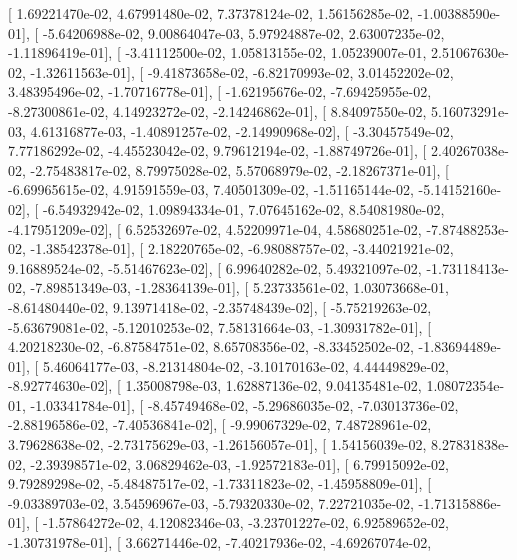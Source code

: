 \documentclass{article}
\begin{document}
       [  1.69221470e-02,   4.67991480e-02,   7.37378124e-02,
          1.56156285e-02,  -1.00388590e-01],
       [ -5.64206988e-02,   9.00864047e-03,   5.97924887e-02,
          2.63007235e-02,  -1.11896419e-01],
       [ -3.41112500e-02,   1.05813155e-02,   1.05239007e-01,
          2.51067630e-02,  -1.32611563e-01],
       [ -9.41873658e-02,  -6.82170993e-02,   3.01452202e-02,
          3.48395496e-02,  -1.70716778e-01],
       [ -1.62195676e-02,  -7.69425955e-02,  -8.27300861e-02,
          4.14923272e-02,  -2.14246862e-01],
       [  8.84097550e-02,   5.16073291e-03,   4.61316877e-03,
         -1.40891257e-02,  -2.14990968e-02],
       [ -3.30457549e-02,   7.77186292e-02,  -4.45523042e-02,
          9.79612194e-02,  -1.88749726e-01],
       [  2.40267038e-02,  -2.75483817e-02,   8.79975028e-02,
          5.57068979e-02,  -2.18267371e-01],
       [ -6.69965615e-02,   4.91591559e-03,   7.40501309e-02,
         -1.51165144e-02,  -5.14152160e-02],
       [ -6.54932942e-02,   1.09894334e-01,   7.07645162e-02,
          8.54081980e-02,  -4.17951209e-02],
       [  6.52532697e-02,   4.52209971e-04,   4.58680251e-02,
         -7.87488253e-02,  -1.38542378e-01],
       [  2.18220765e-02,  -6.98088757e-02,  -3.44021921e-02,
          9.16889524e-02,  -5.51467623e-02],
       [  6.99640282e-02,   5.49321097e-02,  -1.73118413e-02,
         -7.89851349e-03,  -1.28364139e-01],
       [  5.23733561e-02,   1.03073668e-01,  -8.61480440e-02,
          9.13971418e-02,  -2.35748439e-02],
       [ -5.75219263e-02,  -5.63679081e-02,  -5.12010253e-02,
          7.58131664e-03,  -1.30931782e-01],
       [  4.20218230e-02,  -6.87584751e-02,   8.65708356e-02,
         -8.33452502e-02,  -1.83694489e-01],
       [  5.46064177e-03,  -8.21314804e-02,  -3.10170163e-02,
          4.44449829e-02,  -8.92774630e-02],
       [  1.35008798e-03,   1.62887136e-02,   9.04135481e-02,
          1.08072354e-01,  -1.03341784e-01],
       [ -8.45749468e-02,  -5.29686035e-02,  -7.03013736e-02,
         -2.88196586e-02,  -7.40536841e-02],
       [ -9.99067329e-02,   7.48728961e-02,   3.79628638e-02,
         -2.73175629e-03,  -1.26156057e-01],
       [  1.54156039e-02,   8.27831838e-02,  -2.39398571e-02,
          3.06829462e-03,  -1.92572183e-01],
       [  6.79915092e-02,   9.79289298e-02,  -5.48487517e-02,
         -1.73311823e-02,  -1.45958809e-01],
       [ -9.03389703e-02,   3.54596967e-03,  -5.79320330e-02,
          7.22721035e-02,  -1.71315886e-01],
       [ -1.57864272e-02,   4.12082346e-03,  -3.23701227e-02,
          6.92589652e-02,  -1.30731978e-01],
       [  3.66271446e-02,  -7.40217936e-02,  -4.69267074e-02,
\end{document}
